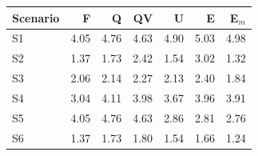 \begin{tabular}{@{}lrrrrrr@{}}
\toprule
Scenario & F & Q & QV & U & E & E$_m$ \\
\midrule
S1 & 4.05 & 4.76 & 4.63 & 4.90 & 5.03 & 4.98 \\
S2 & 1.37 & 1.73 & 2.42 & 1.54 & 3.02 & 1.32 \\
S3 & 2.06 & 2.14 & 2.27 & 2.13 & 2.40 & 1.84 \\
S4 & 3.04 & 4.11 & 3.98 & 3.67 & 3.96 & 3.91 \\
S5 & 4.05 & 4.76 & 4.63 & 2.86 & 2.81 & 2.76 \\
S6 & 1.37 & 1.73 & 1.80 & 1.54 & 1.66 & 1.24 \\
\bottomrule
\end{tabular}